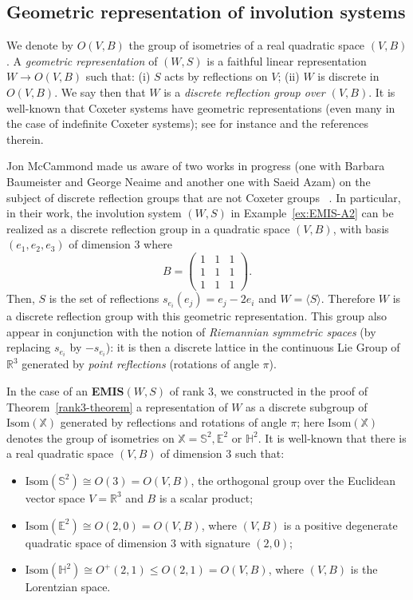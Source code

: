 \documentclass[A4paper, oneside]{amsart}
\newcommand{\Sb}{\mathbb{S}}
\newcommand{\E}{\mathbb{E}}
\newcommand{\Hb}{\mathbb{H}}
\newcommand{\X}{\mathbb{X}}
\newcommand{\EMIS}{\textnormal{\bf EMIS}\xspace}
\newcommand{\Isom}{\text{Isom}}
\theoremstyle{definition}
\begin{document}
\subsection{Geometric representation of involution systems} We denote by $O(V,B)$ the group of isometries of a real quadratic space  $(V,B)$.  A {\em geometric representation} of $(W,S)$  is a faithful linear representation $W\to O(V,B)$ such that: (i) $S$ acts by reflections on $V$; (ii) $W$ is discrete in $O(V,B)$. We say then that $W$ is a {\em discrete reflection group over $(V,B)$}. It is well-known that Coxeter systems have geometric representations (even many in the case of indefinite Coxeter systems); see for instance \cite[\S2.3]{DyHo16} and the references therein.

\smallskip
Jon McCammond made us aware of two works in progress (one with Barbara Baumeister and George Neaime and another one with Saeid Azam) on the subject of discrete reflection groups that are not Coxeter groups~ \cite{McC25}. In particular, in their work, the involution system $(W,S)$ in Example~\ref{ex:EMIS-A2} can be realized as a discrete reflection group in a quadratic space $(V,B)$, with basis $(e_1,e_2,e_3)$ of dimension $3$ where
$$
B=
\begin{pmatrix}
1 & 1 & 1 \\
1 & 1 & 1 \\
1 & 1 & 1
\end{pmatrix}.
$$
Then, $S$ is the set of reflections $s_{e_i}(e_j)=e_j-2e_i$ and $W=\langle S\rangle$. Therefore  $W$ is a discrete reflection group with this geometric representation. This group also appear in conjunction with the notion of {\em Riemannian symmetric spaces} (by replacing $s_{e_i}$ by $-s_{e_i}$): it is then a discrete lattice in the continuous Lie Group of $\mathbb R^3$ generated by {\em point reflections} (rotations of angle $\pi$).
\smallskip

In the case of an \EMIS $(W,S)$ of rank $3$, we constructed in the proof of Theorem~\ref{rank3-theorem} a representation of $W$ as a discrete subgroup of  $\Isom(\X)$ generated by reflections and rotations of angle $\pi$; here $\Isom(\X)$ denotes the group of isometries on $\X = \Sb^2, \E^2$ or $\Hb^2$. It is well-known that there is a real quadratic space $(V,B)$ of dimension $3$ such that:
\begin{itemize}
\item $\Isom(\Sb^2)\cong O(3)=O(V,B)$, the orthogonal group over the Euclidean vector space $V=\mathbb R^3$ and $B$ is a scalar product;
\item $\Isom(\E^2)\cong O(2,0)=O(V,B)$, where $(V,B)$ is a positive degenerate quadratic space of dimension $3$  with signature $(2,0)$; 
\item $\Isom(\Hb^2)\cong O^+(2,1)\leq O(2,1)=O(V,B)$, where $(V,B)$ is the Lorentzian space. 
\end{itemize}
\end{document}
